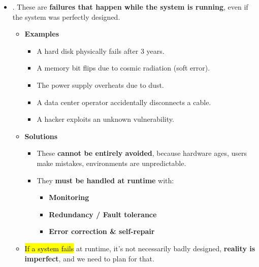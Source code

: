 \begin{itemize}
    \newpage


    \item {}. These are \textbf{failures that happen while the system is running}, even if the system was perfectly designed.
    
    \begin{itemize}
        \item[\textcolor{Green3}{\faIcon{tools}}] \textcolor{Green3}{\textbf{Examples}}
        \begin{itemize}
            \item A hard disk physically fails after 3 years.
            \item A memory bit flips due to cosmic radiation (soft error).
            \item The power supply overheats due to dust.
            \item A data center operator accidentally disconnects a cable.
            \item A hacker exploits an unknown vulnerability.
        \end{itemize}
        \item[\textcolor{Green3}{\faIcon{check}}] \textcolor{Green3}{\textbf{Solutions}}
        \begin{itemize}
            \item These \textbf{cannot be entirely avoided}, because hardware ages, users make mistakes, environments are unpredictable.
            \item They \textbf{must be handled at runtime} with:
            \begin{itemize}
                \item \textbf{Monitoring}
                \item \textbf{Redundancy / Fault tolerance}
                \item \textbf{Error correction \& self-repair}
            \end{itemize}
        \end{itemize}
        \item[\textcolor{Red2}{\faIcon{exclamation-triangle}}] \hl{If a system fails} at runtime, it's not necessarily badly designed, \textbf{reality is imperfect}, and we need to plan for that.
    \end{itemize}
\end{itemize}


